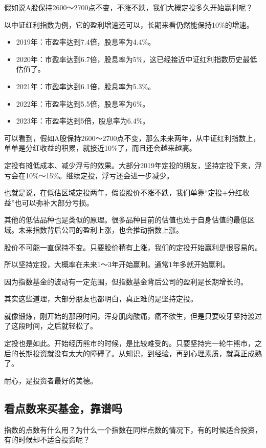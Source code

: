 假如说A股保持2600～2700点不变，不涨不跌，我们大概定投多久开始赢利呢？

以中证红利指数为例，它的盈利增速还可以，长期来看仍然能保持10\%的增速。

\begin{itemize}
\item 2019年：市盈率达到7.4倍，股息率为4.4\%。
\item 2020年：市盈率达到6.7倍，股息率为5\%，这已经接近中证红利指数历史最低估值了。
\item 2021年：市盈率达到6.1倍，股息率为5.3\%。
\item 2022年：市盈率达到5.5倍，股息率为6\%。
\item 2023年：市盈率达到5倍，股息率为6.4\%。
\end{itemize}

可以看到，假如A股保持2600～2700点不变，那么未来两年，从中证红利指数上，单单是分红收益的积累，就接近10\%了，而且还会越来越高。

定投有摊低成本、减少浮亏的效果。大部分2019年定投的朋友，坚持定投下来，浮亏会在10\%～15\%。继续定投，浮亏还会进一步减少。

也就是说，在低估区域定投两年，假设股价不涨不跌，我们单靠“定投+分红收益”也可以弥补大部分亏损。

其他的低估品种也是类似的原理。很多品种目前的估值也处于自身估值的最低区域。未来指数背后公司的盈利上涨，也会推动指数上涨。

股价不可能一直保持不变。只要股价稍有上涨，我们的定投开始赢利是很容易的。

所以坚持定投，大概率在未来1～3年开始赢利。通常1年多就开始赢利。

因为指数基金的波动有一定范围，但指数基金背后公司的盈利是长期增长的。

其实这些道理，大部分朋友也都明白，真正难的是坚持定投。

就像锻炼，刚开始的那段时间，浑身肌肉酸痛，痛不欲生，但是只要咬牙坚持渡过了这段时间，之后就轻松了。

定投也是如此。开始经历熊市的时候，是比较难受的。只要坚持完一轮牛熊市，之后的长期投资就没有太大的障碍了。从知识，到经验，再到心理素质，就真正成熟了。

耐心，是投资者最好的美德。

\subsection{看点数来买基金，靠谱吗}
{\kaishu 指数的点数有什么用？为什么一个指数在同样点数的情况下，有的时候适合投资，有的时候却不适合投资呢？}

